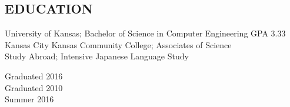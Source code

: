 \documentclass{res}
\begin{document}
\begin{resume}
\section{EDUCATION}\vspace{5pt}
\begin{minipage}{0.8\linewidth}
	\begin{small}
		\begin{flushleft}
			University of Kansas; Bachelor of Science in Computer Engineering GPA 3.33\\Kansas City Kansas Community College; Associates of Science\\Study Abroad; Intensive Japanese Language Study
		\end{flushleft}
	\end{small}   
\end{minipage}
\begin{minipage}{0.2\linewidth}
	\begin{small}   
		\begin{flushright}
			Graduated 2016\\Graduated 2010\\Summer 2016
		\end{flushright}	     
	\end{small}   
\end{minipage}\vspace{-10pt}
 

\end{resume}
\end{document}
